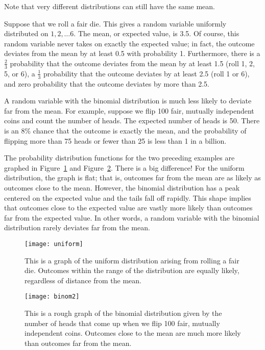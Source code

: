 \begin{editingnotes}

Note that very different distributions can still have the same mean.

\begin{example}
  Suppose that we roll a fair die.  This gives a random variable
  uniformly distributed on $1, 2, \dots 6$.  The mean, or expected
  value, is 3.5.  Of course, this random variable never takes on
  exactly the expected value; in fact, the outcome deviates from the
  mean by at least 0.5 with probability 1.  Furthermore, there is a
  $\frac{2}{3}$ probability that the outcome deviates from the mean by
  at least 1.5 (roll 1, 2, 5, or 6), a $\frac{1}{3}$ probability that
  the outcome deviates by at least 2.5 (roll 1 or 6), and zero
  probability that the outcome deviates by more than 2.5.
\end{example}

\begin{example}
  A random variable with the binomial distribution is much less likely
  to deviate far from the mean.  For example, suppose we flip 100
  fair, mutually independent coins and count the number of heads.  The
  expected number of heads is 50.  There is an 8\% chance that the
  outcome is exactly the mean, and the probability of flipping more
  than 75 heads or fewer than 25 is less than 1 in a billion.
\end{example}

The probability distribution functions for the two preceding examples
are graphed in Figure~\ref{fig:uniform} and Figure~\ref{fig:binom2}.
There is a big difference!  For the uniform distribution, the graph is
flat; that is, outcomes far from the mean are as likely as outcomes
close to the mean.  However, the binomial distribution has a peak
centered on the expected value and the tails fall off rapidly.  This
shape implies that outcomes close to the expected value are vastly
more likely than outcomes far from the expected value.  In other
words, a random variable with the binomial distribution rarely
deviates far from the mean.
\begin{figure}
  \centerline{\texttt{[image: uniform]}}
  \caption{This is a graph of the uniform distribution arising from
    rolling a fair die.  Outcomes within the range of the distribution
    are equally likely, regardless of distance from the mean.}
  \label{fig:uniform}
\end{figure}
\begin{figure}
  \centerline{\texttt{[image: binom2]}}
  \caption{This is a rough graph of the binomial distribution given by
    the number of heads that come up when we flip 100 fair, mutually
    independent coins.  Outcomes close to the mean are much more
    likely than outcomes far from the mean.}
  \label{fig:binom2}
\end{figure}


\end{editingnotes}

